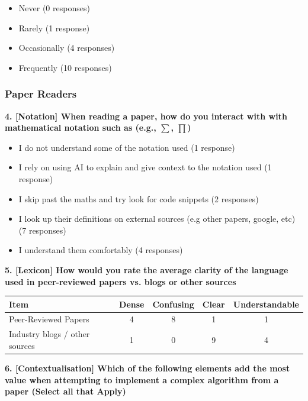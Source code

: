 \begin{itemize}
    \item Never (0 responses)
    \item Rarely (1 response)
    \item Occasionally (4 responses)
    \item Frequently (10 responses)
\end{itemize}


\subsubsection{Paper Readers}

\textbf{4. [Notation] When reading a paper, how do you interact with with mathematical notation such as (e.g., $\sum$, $\prod$)}

\begin{itemize}
    \item I do not understand some of the notation used (1 response)
    \item I rely on using AI to explain and give context to the notation used (1 response)
    \item I skip past the maths and try look for code snippets (2 responses)
    \item I look up their definitions on external sources (e.g other papers, google, etc) (7 responses)
    \item I understand them comfortably (4 responses)
\end{itemize}

\vspace{2em}

\textbf{5. [Lexicon] How would you rate the average clarity of the language used in peer-reviewed papers vs. blogs or other sources}

\begin{table}[h]
\centering
\begin{tabular}{lcccc}
\toprule
Item & Dense & Confusing & Clear & Understandable \\
\midrule
Peer-Reviewed Papers & 4 & 8 & 1 & 1 \\
Industry blogs / other sources & 1 & 0 & 9 & 4 \\
\bottomrule
\end{tabular}
\end{table}

\vspace{2em}

\textbf{6. [Contextualisation] Which of the following elements add the most value when attempting to implement a complex algorithm from a paper (Select all that Apply)}


